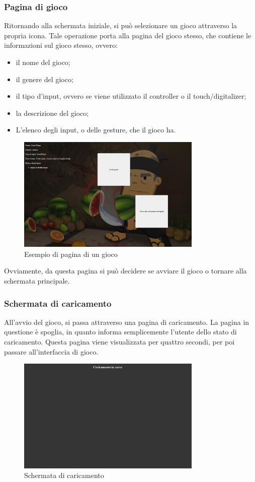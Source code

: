 \subsubsection{Pagina di gioco}
Ritornando alla schermata iniziale, si può selezionare un gioco attraverso la propria icona.
Tale operazione porta alla pagina del gioco stesso, che contiene le informazioni sul gioco stesso, ovvero:
\begin{itemize}
    \item il nome del gioco;
    \item il genere del gioco;
    \item il tipo d'input, ovvero se viene utilizzato il controller o il touch/digitalizer;
    \item la descrizione del gioco;
    \item L'elenco degli input, o delle gesture, che il gioco ha.
\end{itemize}
\begin{figure}[h]
    \centering
    \includegraphics[width=250pt]{images/product/schermataPaginaGioco.png}
    \caption{Esempio di pagina di un gioco}
    \label{fig:schermataPaginaGioco}
\end{figure}
Ovviamente, da questa pagina si può decidere se avviare il gioco o tornare alla schermata principale.
\newpage
\subsubsection{Schermata di caricamento}
All'avvio del gioco, si passa attraverso una pagina di caricamento. La pagina in questione è spoglia, in quanto informa semplicemente l'utente dello stato di caricamento.
Questa pagina viene visualizzata per quattro secondi, per poi passare all'interfaccia di gioco.
\begin{figure}[h]
    \centering
    \includegraphics[width=250pt]{images/product/schermataCaricamento.png}
    \caption{Schermata di caricamento}
    \label{fig:schermataCaricamento}
\end{figure}


